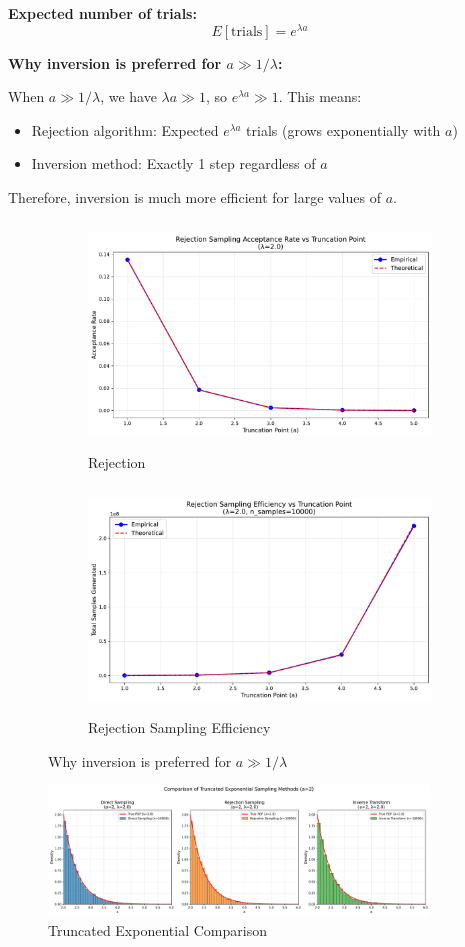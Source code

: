 \textbf{Expected number of trials:}
\begin{equation*}
E[\text{trials}] = e^{\lambda a}
\end{equation*}

\textbf{Why inversion is preferred for $a \gg 1/\lambda$:}

When $a \gg 1/\lambda$, we have $\lambda a \gg 1$, so $e^{\lambda a} \gg 1$. This means:
\begin{itemize}
\item Rejection algorithm: Expected $e^{\lambda a}$ trials (grows exponentially with $a$)
\item Inversion method: Exactly 1 step regardless of $a$
\end{itemize}

Therefore, inversion is much more efficient for large values of $a$.

\begin{figure}[ht]

\begin{subfigure}{0.45\textwidth}
\includegraphics[width=0.9\linewidth, height=6cm]{rejection_sampling_acceptance_rates.pdf} 
\caption{Rejection}
\label{fig:subim1}
\end{subfigure}
\begin{subfigure}{0.45\textwidth}
\includegraphics[width=0.9\linewidth, height=6cm]{rejection_sampling_efficiency.pdf}
\caption{Rejection Sampling Efficiency}
\label{fig:subim2}
\end{subfigure}

\caption{Why inversion is preferred for $a \gg 1/\lambda$}
\label{fig:image2}
\end{figure}

\begin{figure}[ht]
\includegraphics[width=0.9\textwidth]{truncated_exp_comparison_a2.pdf}
\caption{Truncated Exponential Comparison}
\label{fig:figure2}
\end{figure}
